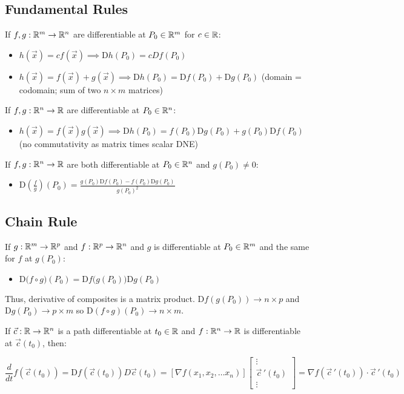 \subsection{Fundamental Rules}

If $f,g:\mathbb{R}^m\to \mathbb{R}^n$ are differentiable at $P_0\in \mathbb{R}^m$ for $c\in \mathbb{R}$:
\begin{itemize}
    \item $h(\vec{x})=cf(\vec{x})\implies \mathrm{D}h(P_0)=cDf(P_0)$
    \item $h(\vec{x})=f(\vec{x})+g(\vec{x})\implies \mathrm{D}h(P_0)=\mathrm{D}f(P_0)+\mathrm{D}g(P_0)$ (domain = codomain; sum of two $n\times m$ matrices)
\end{itemize}

If $f,g:\mathbb{R}^n\to \mathbb{R}$ are differentiable at $P_0\in \mathbb{R}^n$:
\begin{itemize}
    \item $h(\vec{x})=f(\vec{x})g(\vec{x})\implies \mathrm{D}h(P_0)=f(P_0)\mathrm{D}g(P_0)+g(P_0)\mathrm{D}f(P_0)$ (no commutativity as matrix times scalar DNE)
\end{itemize}

If $f,g:\mathbb{R}^n\to \mathbb{R}$ are both differentiable at $P_0\in \mathbb{R}^n$ and $g(P_0)\neq 0$:
\begin{itemize}
    \item $\mathrm{D}\left(\frac{f}{g}\right)(P_0)=\frac{g(P_0)\mathrm{D}f(P_0)-f(P_0)\mathrm{D}g(P_0)}{g(P_0)^2}$
\end{itemize}

\subsection{Chain Rule}

If $g:\mathbb{R}^m\to \mathbb{R}^p$ and $f:\mathbb{R}^p\to \mathbb{R}^n$ and $g$ is differentiable at $P_0\in \mathbb{R}^m$ and the same for $f$ at $g(P_0)$:
\begin{itemize}
    \item $\mathrm{D}\Big(f\circ g\Big)(P_0)=\mathrm{D}f\big(g(P_0)\big)\mathrm{D}g(P_0)$
\end{itemize}

Thus, derivative of composites is a matrix product. $\mathrm{D}f(g(P_0))\to n\times p$ and $\mathrm{D}g(P_0)\to p\times m$
so $\mathrm{D}(f\circ g)(P_0)\to n\times m$.

If $\vec{c}:\mathbb{R}\to \mathbb{R}^n$ is a path differentiable at $t_0\in \mathbb{R}$ and $f:\mathbb{R}^n\to \mathbb{R}$ is differentiable at $\vec{c}(t_0)$, then:

\[\frac{d}{dt}f(\vec{c}(t_0))=\mathrm{D}f(\vec{c}(t_0))D\vec{c}(t_0)=\left[ \nabla f\left( x_{1},x_{2},\ldots x_{n}\right) \right]\begin{bmatrix} \vdots \\ \vec{c}\,'(t_0) \\ \vdots \end{bmatrix}=\nabla f(\vec{c}\,'(t_0))\cdot \vec{c}\,'(t_0)\]

